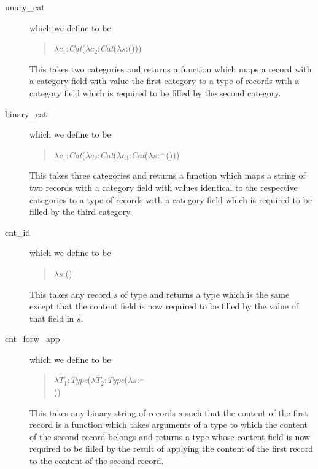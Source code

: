 \begin{description}
\item[\textsf{unary\_cat}] which we define to be
\begin{quote}
$\lambda c_1$:\textit{Cat}($\lambda c_2$:\textit{Cat}($\lambda
s$:()))
\end{quote}
\noindent This takes two categories and returns a function which maps
a record with a category field with value the first category to a type
of records with a category field which is required to be filled by the
second category.

\item[\textsf{binary\_cat}] which we define to be
\begin{quote}
$\lambda c_1$:\textit{Cat}($\lambda c_2$:\textit{Cat}($\lambda c_3$:\textit{Cat}($\lambda
s$:$^\frown$()))
\end{quote}
\noindent This takes three categories and returns a function which maps
a string of two records with a category field with values identical to the respective categories to a type
of records with a category field which is required to be filled by the
third category.



\item[\textsf{cnt\_id}] which we define to be
\begin{quote}
$\lambda
s$:()
\end{quote}
\noindent This takes any record $s$ of type
and returns a type which is the same except that the content field
is now required to be filled by the value of that field in $s$.

\item[\textsf{cnt\_forw\_app}] which we define to be
\begin{quote}
$\lambda T_1$:\textit{Type}($\lambda T_2$:\textit{Type}($\lambda
s$:$^\frown$
\\
\hspace*{2em}()
\end{quote}
\noindent This takes any binary string of records $s$ such that the
content of the first record is a function which takes arguments of a
type to which the content of the second record belongs
and returns a type whose content field
is now required to be filled by the result of applying the content of
the first record to the content of the second record.


\end{description}
